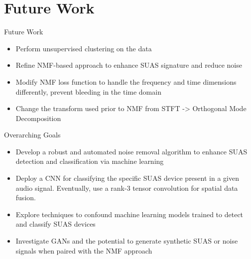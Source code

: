 \documentclass{if-beamer}
\begin{document}
\section{Future Work}

\begin{frame}{Future Work}

\begin{itemize}
    \item Perform unsupervised clustering on the data
    \item Refine NMF-based approach to enhance SUAS signature and reduce noise 
    \item Modify NMF loss function to handle the frequency and time dimensions differently, prevent bleeding in the time domain
    \item Change the transform used prior to NMF from STFT -> Orthogonal Mode Decomposition
\end{itemize}

\begin{block}{Overarching Goals}
    \begin{itemize}
        \item Develop a robust and automated noise removal algorithm to enhance SUAS detection and classification via machine learning
        \item Deploy a CNN for classifying the specific SUAS device present in a given audio signal. Eventually, use a rank-3 tensor convolution for spatial data fusion.
        \item Explore techniques to confound machine learning models trained to detect and classify SUAS devices
        \item Investigate GANs and the potential to generate synthetic SUAS or noise signals when paired with the NMF approach
    \end{itemize}
\end{block}
\end{frame}

\end{document}
